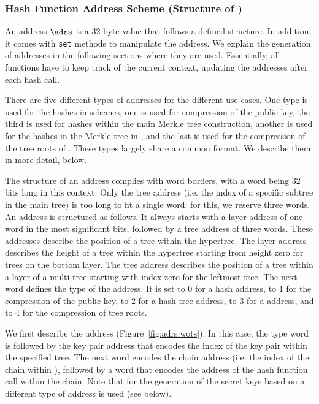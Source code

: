 \subsubsection{Hash Function Address Scheme (Structure of \adrs)}\label{prelim:addresses}

   An address $\adrs$ is a 32-byte value that follows a defined structure.
   In addition, it comes with \texttt{set} methods to manipulate the address.
   We explain the generation of addresses in the following sections where they
   are used. Essentially, all functions have to keep track of the current
   context, updating the addresses after each hash call.

   There are five different types of addresses for the different use
   cases.  One type is used for the hashes in \wotsp schemes, one is used
   for compression of the \wotsp public key, the third is used for
   hashes within the main Merkle tree construction, another is used for
   the hashes in the Merkle tree in \fors, and the last is used for the
   compression of the tree roots of \fors. These types largely share a
   common format. We describe them in more detail, below.

   The structure of an address complies with word borders, with a word
   being 32 bits long in this context.  Only the tree address
   (i.e. the index of a specific subtree in the main tree) is too
   long to fit a single word: for this, we reserve three words. An address is
   structured as follows.  It always starts with a layer address of one
   word in the most significant bits, followed by a tree address of three
   words.  These addresses describe the position of a tree within the hypertree.
   The layer address describes the height of a tree within the
   hypertree starting from height zero for trees on the bottom layer.
   The tree address describes the position
   of a tree within a layer of a multi-tree starting with index zero for
   the leftmost tree.  The next word defines the type of the address.
   It is set to 0 for a \wotsp hash address, to 1 for the compression of the \wotsp public key,
   to 2 for a hash tree address, to 3 for a \fors address, and to 4 for the compression
   of \fors tree roots.

   We first describe the \wotsp address (Figure~\ref{fig:adrs:wots}).
   In this case, the type word
   is followed by the key pair address that encodes the index of the \wotsp
   key pair within the specified tree.  The next word encodes the chain address
   (i.e. the index of the chain within \wotsp),
   followed by a word that encodes the address of the hash function call
   within the chain. Note that for the generation of the secret keys based on \sseed a different type of address is used (see below).

